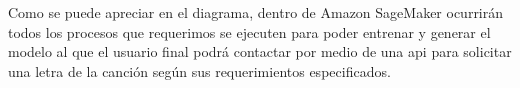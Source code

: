 \documentclass[12pt, a4paper, titlepage]{report}
\begin{document}
	Como se puede apreciar en el diagrama, dentro de Amazon SageMaker ocurrirán todos los procesos que requerimos se ejecuten para poder entrenar y generar el modelo al que el usuario final podrá contactar por medio de una \acrshort{api} para solicitar una letra de la canción según sus requerimientos especificados.

	
\end{document}
